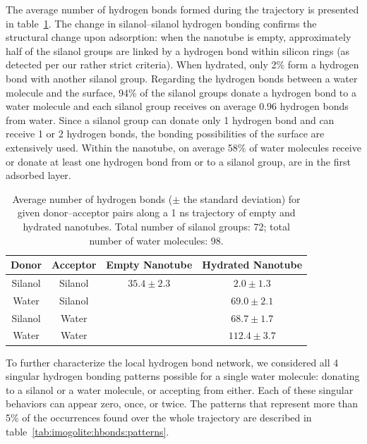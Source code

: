 \documentclass[thesis]{subfiles}
\begin{document}
The average number of hydrogen bonds formed during the trajectory is presented
in table~\ref{tab:imogolite:hbonds:count}. The change in silanol--silanol
hydrogen bonding confirms the structural change upon adsorption: when the
nanotube is empty, approximately half of the silanol groups are linked by a
hydrogen bond within silicon rings (as detected per our rather strict criteria).
When hydrated, only 2\% form a hydrogen bond with another silanol group.
Regarding the hydrogen bonds between a water molecule and the surface, 94\% of
the silanol groups donate a hydrogen bond to a water molecule and each silanol
group receives on average 0.96 hydrogen bonds from water. Since a silanol group
can donate only 1 hydrogen bond and can receive 1 or 2 hydrogen bonds, the
bonding possibilities of the surface are extensively used. Within the nanotube,
on average 58\% of water molecules receive or donate at least one hydrogen bond
from or to a silanol group, \ie are in the first adsorbed layer.

\begin{table}[t]
    \centering
    \caption{Average number of hydrogen bonds ($\pm$ the standard deviation)
    for given donor--acceptor pairs along a 1 ns trajectory of empty and
    hydrated nanotubes. Total number of silanol groups: 72; total number of
    water molecules: 98.}
    \label{tab:imogolite:hbonds:count}
    \begin{tabular}{c c c c}
        \toprule
        Donor   & Acceptor & Empty Nanotube  & Hydrated Nanotube \\
        \midrule
        Silanol & Silanol  & $35.4 \pm 2.3$  & $2.0  \pm 1.3$    \\
        Water   & Silanol  &                 & $69.0 \pm 2.1$    \\
        Silanol & Water    &                 & $68.7 \pm 1.7$    \\
        Water   & Water    &                 & $112.4 \pm 3.7$   \\
        \bottomrule
    \end{tabular}
\end{table}

To further characterize the local hydrogen bond network, we considered all 4
singular hydrogen bonding patterns possible for a single water molecule:
donating to a silanol or a water molecule, or accepting from either. Each of
these singular behaviors can appear zero, once, or twice. The patterns that
represent more than {5\%} of the occurrences found over the whole trajectory are
described in table~\ref{tab:imogolite:hbonds:patterns}.
\end{document}
